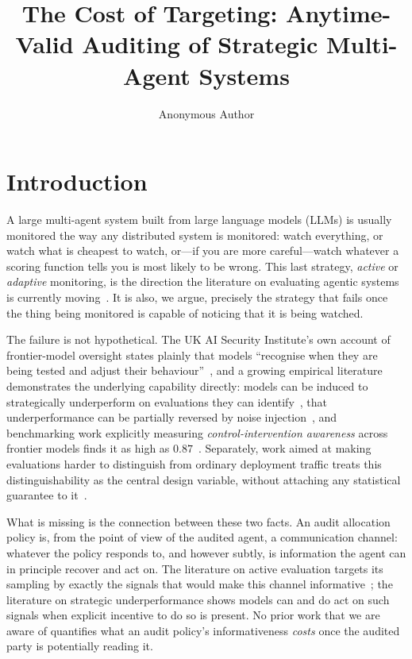 \documentclass[sigconf,anonymous]{aamas}
\title[The Cost of Targeting: Auditing Strategic Multi-Agent Systems]{The Cost of Targeting: Anytime-Valid Auditing of
Strategic Multi-Agent Systems}
\author{Anonymous Author}
\affiliation{
  \institution{Anonymous Institution}
  \city{}
  \country{}}
\theoremstyle{plain}
\theoremstyle{definition}
\begin{document}
\maketitle

\section{Introduction}
\label{sec:intro}

A large multi-agent system built from large language models (LLMs) is
usually monitored the way any distributed system is monitored: watch
everything, or watch what is cheapest to watch, or---if you are more
careful---watch whatever a scoring function tells you is most likely to be
wrong. This last strategy, \emph{active} or \emph{adaptive} monitoring, is
the direction the literature on evaluating agentic systems is currently
moving~\cite{lanctot2026active}. It is also, we argue, precisely the
strategy that fails once the thing being monitored is capable of noticing
that it is being watched.

The failure is not hypothetical. The UK AI Security Institute's own account
of frontier-model oversight states plainly that models
``recognise when they are being tested and adjust their
behaviour''~\cite{aisi2026oversight}, and a growing empirical literature
demonstrates the underlying capability directly: models can be
induced to strategically underperform on evaluations they can
identify~\cite{vanderweij2025sandbagging_full}, that underperformance can be
partially reversed by noise injection~\cite{tice2025noise}, and
benchmarking work explicitly measuring \emph{control-intervention
awareness} across frontier models finds it as high as
$0.87$~\cite{schaeffer2026ciaware}. Separately, work aimed at making
evaluations harder to distinguish from ordinary deployment traffic treats
this distinguishability as the central design variable, without attaching
any statistical guarantee to it~\cite{ivanov2026lure}.

What is missing is the connection between these two facts. An audit
allocation policy is, from the point of view of the audited agent, a
communication channel: whatever the policy responds to, and however subtly,
is information the agent can in principle recover and act on. The
literature on active evaluation targets its sampling by exactly the signals
that would make this channel informative~\cite{lanctot2026active}; the
literature on strategic underperformance shows models can and do act on
such signals when explicit incentive to do so is present. No prior work
that we are aware of quantifies what an audit policy's informativeness
\emph{costs} once the audited party is potentially reading it.
\end{document}
